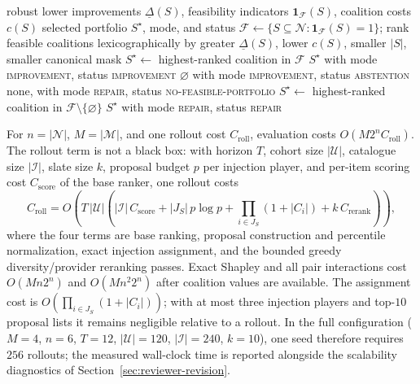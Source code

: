 \documentclass[pdflatex,sn-mathphys-num]{sn-jnl}
\theoremstyle{thmstyleone}
\theoremstyle{thmstyletwo}
\theoremstyle{thmstylethree}
\newcommand{\Players}{\mathcal{N}}
\newcommand{\Models}{\mathcal{M}}
\begin{document}
\begin{algorithm}[t]
\caption{Improvement/repair portfolio selection. The output distinguishes the decision \emph{mode} (improvement or repair, determined by base feasibility) from the final \emph{status}.}\label{alg:planner}
\begin{algorithmic}[1]
\Require robust lower improvements $\underline\Delta(S)$, feasibility indicators $\mathbf{1}_{\mathcal F}(S)$, coalition costs $c(S)$
\Ensure selected portfolio $S^\star$, mode, and status
\State $\mathcal F\gets\{S\subseteq\Players:\mathbf{1}_{\mathcal F}(S)=1\}$; rank feasible coalitions lexicographically by greater $\underline\Delta(S)$, lower $c(S)$, smaller $|S|$, smaller canonical mask
 
  \State $S^\star\gets$ highest-ranked coalition in $\mathcal F$
    \State \Return $S^\star$ with mode \textsc{improvement}, status \textsc{improvement}
  \Else
    \State \Return $\varnothing$ with mode \textsc{improvement}, status \textsc{abstention}
  \EndIf
\Else {}
    \State \Return none, with mode \textsc{repair}, status \textsc{no-feasible-portfolio}
  \Else
    \State $S^\star\gets$ highest-ranked coalition in $\mathcal F\setminus\{\varnothing\}$
    \State \Return $S^\star$ with mode \textsc{repair}, status \textsc{repair}
  \EndIf
\EndIf
\end{algorithmic}
\end{algorithm}

For $n=|\Players|$, $M=|\Models|$, and one rollout cost $C_{\mathrm{roll}}$, evaluation costs $O(M2^nC_{\mathrm{roll}})$. The rollout term is not a black box: with horizon $T$, cohort size $|\mathcal{U}|$, catalogue size $|\mathcal{I}|$, slate size $k$, proposal budget $p$ per injection player, and per-item scoring cost $C_{\mathrm{score}}$ of the base ranker, one rollout costs
\begin{equation}
 C_{\mathrm{roll}}=O\!\left(T\,|\mathcal{U}|\left(|\mathcal{I}|\,C_{\mathrm{score}}+|J_S|\,p\log p+\textstyle\prod_{i\in J_S}(1+|C_i|)+k\,C_{\mathrm{rerank}}\right)\right),
\label{eq:croll}
\end{equation}
where the four terms are base ranking, proposal construction and percentile normalization, exact injection assignment, and the bounded greedy diversity/provider reranking passes. Exact Shapley and all pair interactions cost $O(Mn2^n)$ and $O(Mn^2 2^n)$ after coalition values are available. The assignment cost is $O(\prod_{i\in J_S}(1+|C_i|))$; with at most three injection players and top-$10$ proposal lists it remains negligible relative to a rollout. In the full configuration ($M=4$, $n=6$, $T=12$, $|\mathcal{U}|=120$, $|\mathcal{I}|=240$, $k=10$), one seed therefore requires $256$ rollouts; the measured wall-clock time is reported alongside the scalability diagnostics of Section~\ref{sec:reviewer-revision}.
\end{document}
